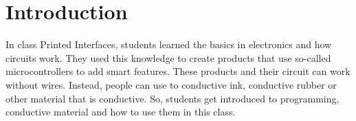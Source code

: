 \documentclass[00_doc.tex]{subfiles}
\begin{document}
    \section{Introduction}
    \begin{flushleft}
        In class Printed Interfaces, students learned the basics in electronics and how 
        circuits work. They used this knowledge to create products that use so-called 
        microcontrollers to add smart features.
        These products and their circuit can work without wires. Instead, people can 
        use to conductive ink, conductive rubber or other material that is conductive. 
        So, students get introduced to programming, conductive material and how 
        to use them in this class.
    \end{flushleft}
\end{document}
